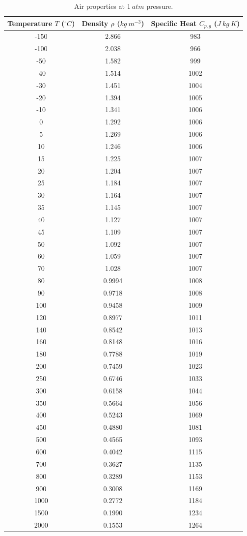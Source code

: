 \documentclass[../Interim_Report_Master]{subfiles}
\begin{document}
\begin{table}[]
	\centering
	\begin{tabular}{|c c c|}
		\hline
		Temperature $T$ ($^\circ C$) & Density $\rho$ ($kg~m^{-3}$) & Specific Heat $C_{p,g}$ ($J~kg~K$) \\ \hline
		-150 & 2.866 & 983 \\
		-100 & 2.038 & 966 \\
		-50 & 1.582 & 999 \\
		-40 & 1.514 & 1002 \\
		-30 & 1.451 & 1004 \\
		-20 & 1.394 & 1005 \\
		-10 & 1.341 & 1006 \\
		0 & 1.292 & 1006 \\
		5 & 1.269 & 1006 \\
		10 & 1.246 & 1006 \\
		15 & 1.225 & 1007 \\
		20 & 1.204 & 1007 \\
		25 & 1.184 & 1007 \\
		30 & 1.164 & 1007 \\
		35 & 1.145 & 1007 \\
		40 & 1.127 & 1007 \\
		45 & 1.109 & 1007 \\
		50 & 1.092 & 1007 \\
		60 & 1.059 & 1007 \\
		70 & 1.028 & 1007 \\
		80 & 0.9994 & 1008 \\
		90 & 0.9718 & 1008 \\
		100 & 0.9458 & 1009 \\
		120 & 0.8977 & 1011 \\
		140 & 0.8542 & 1013 \\
		160 & 0.8148 & 1016 \\
		180 & 0.7788 & 1019 \\
		200 & 0.7459 & 1023 \\
		250 & 0.6746 & 1033 \\
		300 & 0.6158 & 1044 \\
		350 & 0.5664 & 1056 \\
		400 & 0.5243 & 1069 \\
		450 & 0.4880 & 1081 \\
		500 & 0.4565 & 1093 \\
		600 & 0.4042 & 1115 \\
		700 & 0.3627 & 1135 \\
		800 & 0.3289 & 1153 \\
		900 & 0.3008 & 1169 \\
		1000 & 0.2772 & 1184 \\
		1500 & 0.1990 & 1234 \\
		2000 & 0.1553 & 1264 \\ \hline
	\end{tabular}
	\caption{Air properties at $1~atm$ pressure.}
	\label{air_data}
\end{table}
\end{document}
